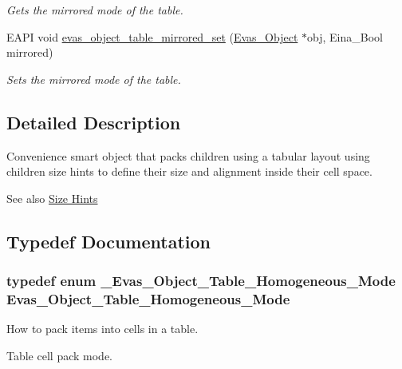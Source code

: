 \begin{DoxyCompactItemize}
\begin{DoxyCompactList}\small\item\em Gets the mirrored mode of the table. \item\end{DoxyCompactList}\item 
EAPI void \hyperlink{group__Evas__Object__Table_ga8f775fb97bf5da5e8a0005a89027044b}{evas\_\-object\_\-table\_\-mirrored\_\-set} (\hyperlink{group__Evas__Object__Group_ga9e19e6dd1f517a0ba437c0114d3e7c97}{Evas\_\-Object} $\ast$obj, Eina\_\-Bool mirrored)
\begin{DoxyCompactList}\small\item\em Sets the mirrored mode of the table. \item\end{DoxyCompactList}\end{DoxyCompactItemize}


\subsection{Detailed Description}
Convenience smart object that packs children using a tabular layout using children size hints to define their size and alignment inside their cell space. \begin{DoxySeeAlso}{See also}
\hyperlink{group__Evas__Object__Group__Size__Hints}{Size Hints} 
\end{DoxySeeAlso}


\subsection{Typedef Documentation}
\subsubsection[{Evas\_\-Object\_\-Table\_\-Homogeneous\_\-Mode}]{\setlength{\rightskip}{0pt plus 5cm}typedef enum {\bf \_\-Evas\_\-Object\_\-Table\_\-Homogeneous\_\-Mode}  {\bf Evas\_\-Object\_\-Table\_\-Homogeneous\_\-Mode}}\label{group__Evas__Object__Table_ga04f33e792aea51d583c3e572a35ceebe}


How to pack items into cells in a table. 

Table cell pack mode. 

